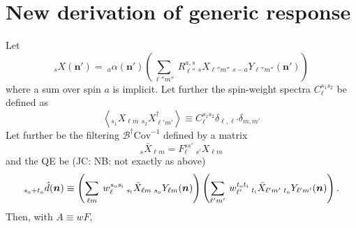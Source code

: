 \documentclass{article}
\newcommand{\Cov}[0]{{\textrm{Cov}}}
\newcommand{\si}[0]{{s_{\rm i}}}
\newcommand{\ti}[0]{{t_{\rm i}}}
\newcommand{\so}[0]{{s_{\rm o}}}
\renewcommand{\to}[0]{{t_{\rm o}}}
\newcommand{\av}[1]{\left\langle #1 \right\rangle}
\newcommand{\JC}[1]{\color{red}JC: #1\color{black}}
\newcommand{\hn}[0]{\boldsymbol{n}}
\begin{document}
\section{New derivation of generic response}
Let 
\begin{equation}
	_{s}X(\hn') = \:_{a}\alpha(\hn') \left( \sum_{\ell'' m''}\: R_{\ell''}^{a, s} \:_sX_{\ell'' m''}\: _{s- a}Y_{\ell'' m''}(\hn')\right) 
\end{equation}
where a sum over spin $a$ is implicit.
Let further the spin-weight spectra $C_\ell^{s_1s_2}$ be defined as
\begin{equation}
	\av{_{s_1}X_{\ell m}\: _{s_2}X^\dagger_{\ell' m'}} \equiv C_\ell^{s_1s_2} \delta_{\ell, \ell'} \delta_{m, m'}
\end{equation}
Let further be the filtering $\mathcal B^\dagger \Cov^{-1}$ defined by a matrix
\begin{equation}
_s 	\bar X_{\ell m} = F^{s s'}_\ell \:_{s'} X_{\ell m}
\end{equation}
and the QE be (\JC{NB: not exactly as above})
\begin{equation}
 _{\so + \to}\hat d(\hn) \equiv  \left(\sum_{\ell m}\: w^{\so\si}_\ell \:_{\si} \bar X_{\ell m} \:_\so Y_{\ell m}(\hn)\right)\left(\sum_{\ell' m'}\:w^{\to\ti}_{\ell'}  \:_{\ti} \bar X_{\ell' m'} \:_\to Y_{\ell' m'}(\hn)\right).
\end{equation}
Then, with $A \equiv wF$,
\end{document}
